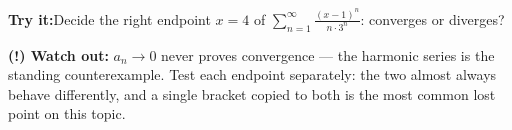 \documentclass[12pt]{article}
\begin{document}
\begin{tryitbox}
\textbf{Try it:}\quad Decide the right endpoint $x = 4$ of
$\displaystyle\sum_{n=1}^{\infty} \frac{(x-1)^n}{n \cdot 3^n}$: converges or
diverges?\\[2pt]
\end{tryitbox}

\begin{watchoutbox}
\textbf{(!) Watch out:} $a_n \to 0$ never proves convergence --- the harmonic
series is the standing counterexample. Test each endpoint separately: the two
almost always behave differently, and a single bracket copied to both is the
most common lost point on this topic.
\end{watchoutbox}
\end{document}

